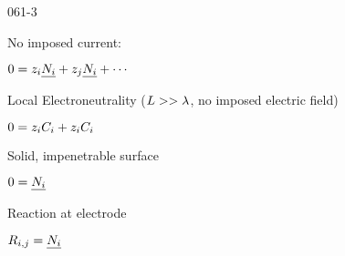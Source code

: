 \begin{mitframe}{061-3}
\begin{listone}
	\item No imposed current:
    \item $0=z_{\state}\uline{\massspecflux{i}}+z_{j}\uline{\massspecflux{i}}+\cdots$
    \item Local Electroneutrality ($\length>>\wavel$, no imposed electric field)
    \item $0=z_{\state}\conc_{\state}+z_{\state}\conc_{\state}$
\item Solid, impenetrable surface
\item $0=\uline{\massspecflux{i}}$
\item Reaction at electrode
\item $\gasconst_{\state,j}=\uline{\massspecflux{i}}$
\end{listone}
\end{mitframe}